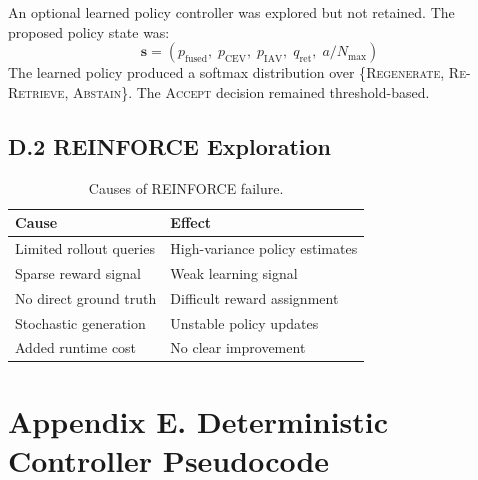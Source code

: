 An optional learned policy controller was explored but not retained. The proposed policy state was:
\[
    \mathbf{s} = (p_{\text{fused}},\; p_{\text{CEV}},\; p_{\text{IAV}},\; q_{\text{ret}},\; a / N_{\max})
\]
The learned policy produced a softmax distribution over \{\textsc{Regenerate}, \textsc{Re-Retrieve}, \textsc{Abstain}\}. The \textsc{Accept} decision remained threshold-based.

\subsection*{D.2 REINFORCE Exploration}

\begin{table}[!htb]
\centering
\caption*{Causes of REINFORCE failure.}
\begin{tabular}{@{}ll@{}}
\toprule
\textbf{Cause} & \textbf{Effect} \\
\midrule
Limited rollout queries & High-variance policy estimates \\
Sparse reward signal & Weak learning signal \\
No direct ground truth & Difficult reward assignment \\
Stochastic generation & Unstable policy updates \\
Added runtime cost & No clear improvement \\
\bottomrule
\end{tabular}
\end{table}

\section*{Appendix E. Deterministic Controller Pseudocode}

